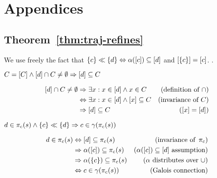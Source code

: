 \section{Appendices}

\subsection{Theorem~\ref{thm:traj-refines}}

We use freely the fact that $\{ c \} \ll \{ d \} \Leftrightarrow \alpha([c]) \subseteq [d]$ and $[\{ c \}] = [c]$. .

\begin{lemma} \label{lem:class-sub}
$C = [C] \wedge [d] \cap C \neq \emptyset \Rightarrow [d] \subseteq C$
\end{lemma}
%
\begin{align*}
[d] \cap C \neq \emptyset & \Rightarrow \exists x : x \in [d] \wedge x \in C             & (\textrm{definition of } \cap) \\
                              & \Leftrightarrow     \exists x : x \in [d] \wedge [x] \subseteq C & (\textrm{invariance of } C) \\
                              & \Rightarrow [d] \subseteq C                                  & ([x] = [d])
\end{align*}


\begin{lemma} \label{lem:traj-con}
$d \in \operatorname{\pi_{\textrm{c}}}(s) \wedge \{ c \} \ll \{ d \} \Rightarrow c \in \gamma(\operatorname{\pi_{\textrm{c}}}(s))$
\end{lemma}
%
\begin{align*}
d \in \operatorname{\pi_{\textrm{c}}}(s) & \Leftrightarrow     [d] \subseteq \operatorname{\pi_{\textrm{c}}}(s)         & (\textrm{invariance of } \operatorname{\pi_{\textrm{c}}}) \\
                     & \Rightarrow \alpha([c]) \subseteq \operatorname{\pi_{\textrm{c}}}(s) & (\alpha([c]) \subseteq [d] \textrm{ assumption}) \\
                     & \Rightarrow \alpha(\{ c \}) \subseteq \operatorname{\pi_{\textrm{c}}}(s) & (\alpha \textrm{ distributes over } \cup) \\
                     & \Leftrightarrow     c \in \gamma(\operatorname{\pi_{\textrm{c}}}(s))             & (\textrm{Galois connection})
\end{align*}


